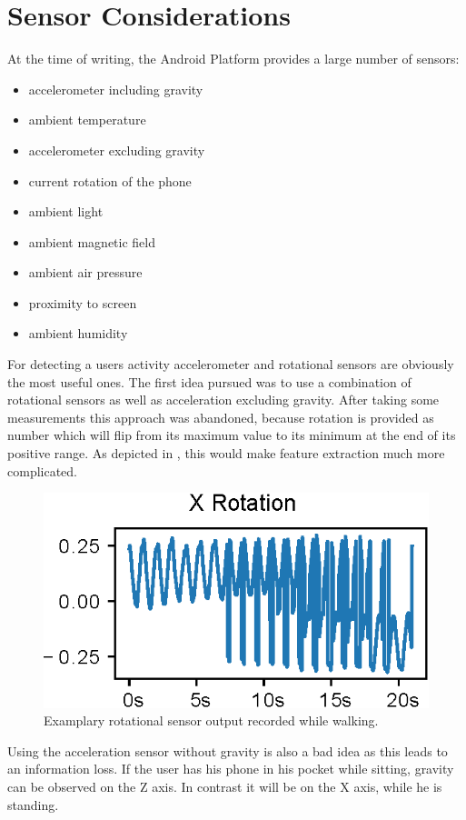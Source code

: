\section{Sensor Considerations}
\label{sec:sensors}
At the time of writing, the Android Platform provides a large number of sensors\autocite{Android:Sensors}: 
\begin{itemize}
\item accelerometer including gravity
\item ambient temperature
\item accelerometer excluding gravity
\item current rotation of the phone
\item ambient light
\item ambient magnetic field
\item ambient air pressure
\item proximity to screen
\item ambient humidity
\end{itemize}
For detecting a users activity accelerometer and rotational sensors are obviously the most useful ones. The first idea pursued was to use a combination of rotational sensors as well as acceleration excluding gravity. After taking some measurements this approach was abandoned, because rotation is provided as number which will flip from its maximum value to its minimum at the end of its positive range. As depicted in , this would make feature extraction much more complicated.
\begin{figure}[htpb]
\centering
\includegraphics[width=\linewidth]{rotation_example.eps}
\caption{Examplary rotational sensor output recorded while walking.}
\label{myfig:rotation_sensor}
\end{figure}
Using the acceleration sensor without gravity is also a bad idea as this leads to an information loss. If the user has his phone in his pocket while sitting, gravity can be observed on the Z axis. In contrast it will be on the X axis, while he is standing.

